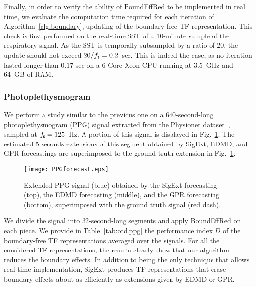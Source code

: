 Finally, in order to verify the ability of {\sf BoundEffRed} to be implemented in real time, we evaluate the computation time required for each iteration of Algorithm~\ref{alg:boundary}, updating of the boundary-free TF representation. This check is first performed on the real-time SST of a 10-minute sample of the respiratory signal. As the SST is temporally subsampled by a ratio of 20, the update should not exceed $20/f_{\mathsf s}=0.2$~sec. This is indeed the case, as no iteration lasted longer than $0.17$ sec on a 6-Core Xeon CPU running at 3.5~GHz and 64~GB of RAM.

\subsubsection{Photoplethysmogram}
\label{ssse:ppg}
We perform a study similar to the previous one on a $640$-second-long photoplethysmogram (PPG) signal extracted from the Physionet dataset~\cite{Pimentel17toward, Goldberger00physiobank}, sampled at $f_{\mathsf s}=125$~Hz. A portion of this signal is displayed in Fig.~\ref{fig:ppg}. The estimated 5 seconds extensions of this segment obtained by {\sf SigExt}, EDMD, and GPR forecastings  are superimposed to the ground-truth extension in Fig.~\ref{fig:ppg}.

\begin{figure}
\texttt{[image: PPGforecast.eps]}
\caption{Extended PPG signal (blue) obtained by the {\sf SigExt} forecasting (top), the EDMD forecasting (middle), and the GPR forecasting (bottom), superimposed with the ground truth signal (red dash).}
\label{fig:ppg}
\end{figure}

We divide the signal into 32-second-long segments and apply {\sf BoundEffRed} on each piece. We provide in Table~\ref{tab:otd.ppg} the performance index $D$ of the boundary-free TF representations averaged over the signals. For all the considered TF representations, the results clearly show that our algorithm reduces the boundary effects. In addition to being the only technique that allows real-time implementation, {\sf SigExt} produces TF representations that erase boundary effects about as efficiently as extensions given by EDMD or GPR.

